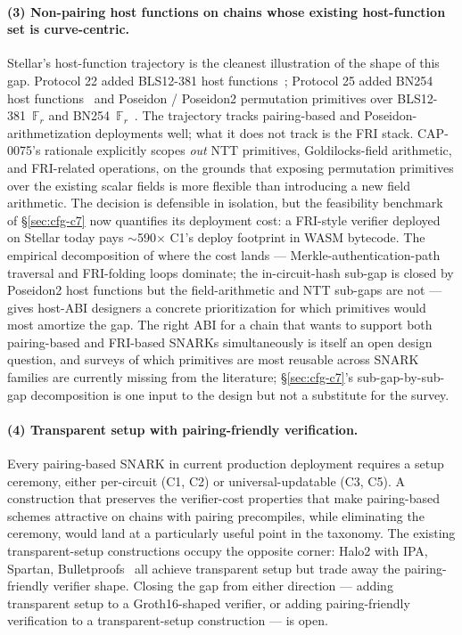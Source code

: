 \paragraph{(3) Non-pairing host functions on chains whose existing
host-function set is curve-centric.}
\label{sec:open-host}
Stellar's host-function trajectory is the cleanest illustration of the
shape of this gap. Protocol 22 added {BLS12-381} host
functions~\cite{stellar-cap-0059}; Protocol 25 added {BN254}
host functions~\cite{stellar-cap-0074} and Poseidon / Poseidon2
permutation primitives over {BLS12-381}~$\mathbb{F}_r$ and
{BN254}~$\mathbb{F}_r$~\cite{stellar-cap-0075}. The
trajectory tracks pairing-based and Poseidon-arithmetization
deployments well; what it does not track is the FRI stack.
{CAP-0075}'s rationale explicitly scopes \emph{out} {NTT}
primitives, Goldilocks-field arithmetic, and FRI-related operations,
on the grounds that exposing permutation primitives over the
existing scalar fields is more flexible than introducing a new field
arithmetic. The decision is defensible in isolation, but the
feasibility benchmark of \S\ref{sec:cfg-c7} now quantifies its
deployment cost: a FRI-style verifier deployed on Stellar today pays
$\sim$590$\times$ C1's deploy footprint in WASM bytecode. The
empirical decomposition of where the cost lands ---
Merkle-authentication-path traversal and FRI-folding loops dominate;
the in-circuit-hash sub-gap is closed by Poseidon2 host functions
but the field-arithmetic and NTT sub-gaps are not --- gives
host-ABI designers a concrete prioritization for which primitives
would most amortize the gap. The right ABI for a chain that wants to
support both pairing-based and FRI-based SNARKs simultaneously is
itself an open design question, and surveys of which primitives are
most reusable across SNARK families are currently missing from the
literature; \S\ref{sec:cfg-c7}'s
sub-gap-by-sub-gap decomposition is one input to the design but not a
substitute for the survey.

\paragraph{(4) Transparent setup with pairing-friendly verification.}
Every pairing-based SNARK in current production deployment requires a
setup ceremony, either per-circuit (C1, C2) or universal-updatable
(C3, C5). A construction that preserves the
verifier-cost properties that make pairing-based schemes attractive
on chains with pairing precompiles, while eliminating the ceremony,
would land at a particularly useful point in the taxonomy. The
existing transparent-setup constructions occupy the
opposite corner: Halo2 with IPA, Spartan, Bulletproofs~\cite{bunz-2018-bulletproofs}
all achieve transparent setup but trade away the
pairing-friendly verifier shape. Closing the gap from either
direction --- adding transparent setup to a Groth16-shaped verifier,
or adding pairing-friendly verification to a transparent-setup
construction --- is open.

